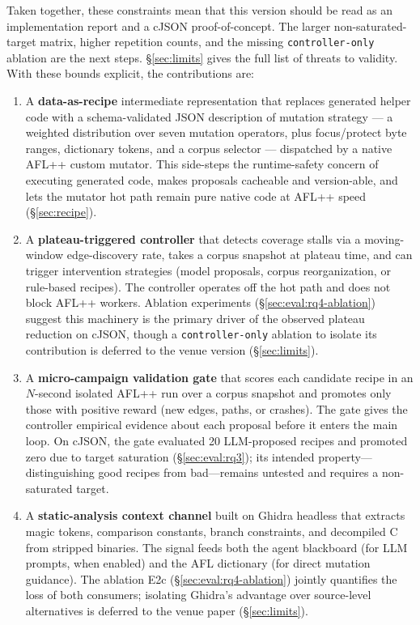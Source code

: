 \documentclass[11pt]{article}
\begin{document}
Taken together, these constraints mean that this version should be
read as an implementation report and a cJSON proof-of-concept. The
larger non-saturated-target matrix, higher repetition counts, and the
missing \texttt{controller-only} ablation are the next steps.
\S\ref{sec:limits} gives the full list of threats to validity. With
these bounds explicit, the contributions are:

\begin{enumerate}
  \item[\textbf{C1}] A \textbf{data-as-recipe} intermediate
  representation that replaces generated helper code with a
  schema-validated JSON description of mutation strategy ---
  a weighted distribution over seven mutation operators, plus
  focus/protect byte ranges, dictionary tokens, and a corpus
  selector --- dispatched by a native AFL++ custom mutator. This
  side-steps the runtime-safety concern of executing generated
  code, makes proposals cacheable and version-able, and lets the
  mutator hot path remain pure native code at AFL++ speed
  (\S\ref{sec:recipe}).
  \item[\textbf{C2}] A \textbf{plateau-triggered controller} that
  detects coverage stalls via a moving-window edge-discovery rate,
  takes a corpus snapshot at plateau time, and can trigger
  intervention strategies (model proposals, corpus reorganization, or
  rule-based recipes). The controller operates off the hot path and
  does not block AFL++ workers. Ablation experiments
  (\S\ref{sec:eval:rq4-ablation}) suggest this machinery is the
  primary driver of the observed plateau reduction on cJSON, though
  a \texttt{controller-only} ablation to isolate its contribution is
  deferred to the venue version (\S\ref{sec:limits}).
  \item[\textbf{C3}] A \textbf{micro-campaign validation gate} that
  scores each candidate recipe in an $N$-second isolated AFL++ run
  over a corpus snapshot and promotes only those with positive
  reward (new edges, paths, or crashes). The gate gives the
  controller empirical evidence about each proposal before it enters
  the main loop. On cJSON, the gate evaluated 20 LLM-proposed
  recipes and promoted zero due to target saturation
  (\S\ref{sec:eval:rq3}); its intended property---distinguishing
  good recipes from bad---remains untested and requires a
  non-saturated target.
  \item[\textbf{C4}] A \textbf{static-analysis context channel}
  built on Ghidra headless that extracts magic tokens, comparison
  constants, branch constraints, and decompiled C from stripped
  binaries. The signal feeds both the agent blackboard (for LLM
  prompts, when enabled) and the AFL dictionary (for direct mutation guidance).
  The ablation E2c (\S\ref{sec:eval:rq4-ablation}) jointly
  quantifies the loss of both consumers; isolating Ghidra's
  advantage over source-level alternatives is deferred to the venue
  paper (\S\ref{sec:limits}).
\end{enumerate}
\end{document}
